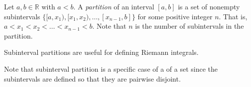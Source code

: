 \documentclass[12pt]{article}
\begin{document}
Let $a,b \in \mathbb{R}$ with $a<b$.  A {\sl partition\/} of an interval $[a,b]$ is a set of nonempty subintervals $\{ [a,x_1), [x_1,x_2), \dots , [x_{n-1}, b] \}$ for some positive integer $n$.  That is, $a<x_1<x_2<\dots<x_{n-1}<b$.  Note that $n$ is the number of subintervals in the partition.

Subinterval partitions are useful for defining Riemann integrals.

Note that subinterval partition is a specific case of a  of a set since the subintervals are defined so that they are pairwise disjoint.
\end{document}
